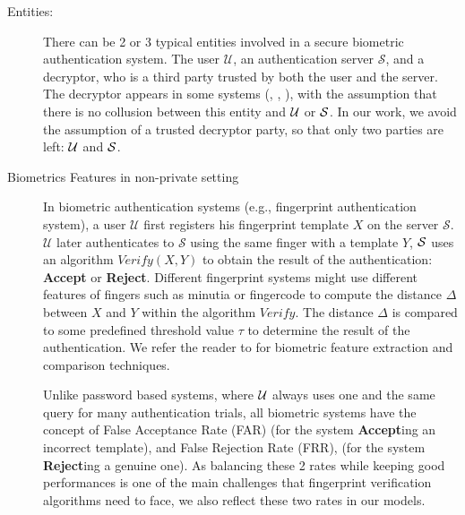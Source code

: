 \begin{description}
\item[Entities:] There can be 2 or 3 typical entities involved in a secure
  biometric authentication system. The user $\mathcal{U}$, an authentication
  server $\mathcal{S}$, and a decryptor, who is a third party trusted by both
  the user and the server. The decryptor appears in some systems
  (\cite{mandal2015comprehensive}, \cite{hirano2013cryptographically},
  \cite{higo2015privacy}), with the assumption that there is no collusion
  between this entity and $\mathcal{U}$ or $\mathcal{S}$. In our work, we avoid the
  assumption of a trusted decryptor party, so that only two parties are left:
  $\mathcal{U}$ and $\mathcal{S}$.
\item[Biometrics Features in non-private setting] In biometric authentication
  systems (e.g., fingerprint authentication system), a user $\mathcal{U}$ first
  registers his fingerprint template $X$ on the server
  $\mathcal{S}$. $\mathcal{U}$ later authenticates to $\mathcal{S}$ using
  the same finger with a template $Y$, $\mathcal{S}$ uses an algorithm $Verify(X,Y)$
  to obtain the result of the authentication: \textbf{Accept} or
  \textbf{Reject}. Different fingerprint systems might use different features of
  fingers such as minutia or fingercode \cite{ferrara2012noninvertible, jain1999fingercode} to compute the distance $\Delta$ between
  $X$ and $Y$ within the algorithm $Verify$. The distance $\Delta$ is compared
  to some predefined threshold value $\tau$ to determine the result of the
  authentication. We refer the reader to \cite{jain2007handbook} for biometric
  feature extraction and
  comparison techniques.

  Unlike password based systems, where $\mathcal{U}$ always uses one and the same
  query for many authentication trials, all biometric systems have the concept
  of False Acceptance Rate (FAR) (for the system \textbf{Accept}ing an incorrect
  template), and False Rejection Rate (FRR), (for the system \textbf{Reject}ing
  a genuine one).  As balancing these 2 rates while keeping good performances is
  one of the main challenges that fingerprint verification algorithms
  \cite{FVConGoi2:online} need to face, we also reflect these two rates in our
  models.


\end{description}
